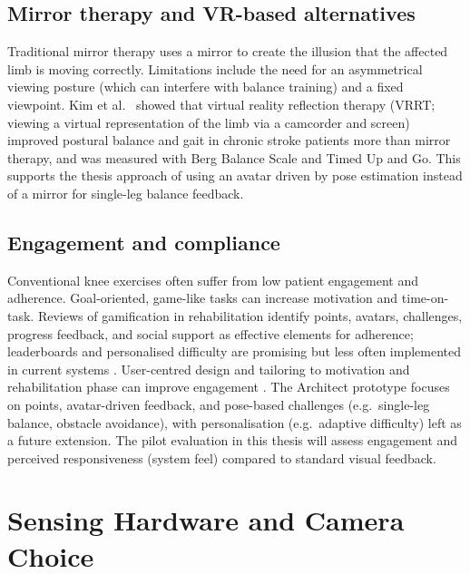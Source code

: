 \subsection{Mirror therapy and VR-based alternatives}

Traditional mirror therapy uses a mirror to create the illusion that the affected limb is moving correctly. Limitations include the need for an asymmetrical viewing posture (which can interfere with balance training) and a fixed viewpoint. Kim et al.\ \cite{kim2020vrrt} showed that virtual reality reflection therapy (VRRT; viewing a virtual representation of the limb via a camcorder and screen) improved postural balance and gait in chronic stroke patients more than mirror therapy, and was measured with Berg Balance Scale and Timed Up and Go. This supports the thesis approach of using an avatar driven by pose estimation instead of a mirror for single-leg balance feedback.

\subsection{Engagement and compliance}

Conventional knee exercises often suffer from low patient engagement and adherence. Goal-oriented, game-like tasks can increase motivation and time-on-task. Reviews of gamification in rehabilitation identify points, avatars, challenges, progress feedback, and social support as effective elements for adherence; leaderboards and personalised difficulty are promising but less often implemented in current systems \cite{ren2025gamification, wang2025airehab}. User-centred design and tailoring to motivation and rehabilitation phase can improve engagement \cite{mcclincy2021gamification}. The Architect prototype focuses on points, avatar-driven feedback, and pose-based challenges (e.g.\ single-leg balance, obstacle avoidance), with personalisation (e.g.\ adaptive difficulty) left as a future extension. The pilot evaluation in this thesis will assess engagement and perceived responsiveness (system feel) compared to standard visual feedback.

\section{Sensing Hardware and Camera Choice}\label{sec:sensing}

